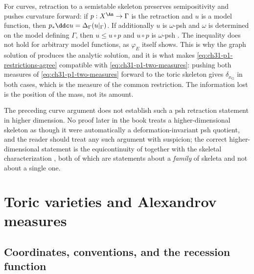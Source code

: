 \begin{remark}
\label{rem:ch31-retraction}
For curves, retraction to a semistable skeleton preserves semipositivity and
pushes curvature forward: if $p:X^{\An}\to\Gamma$ is the retraction and
$u$ is a model function, then $p_*\ddc u=\Delta_\Gamma(u|_\Gamma)$.
If additionally $u$ is $\omega$-psh and $\omega$ is determined on the
model defining $\Gamma$, then $u\leq u\circ p$ and $u\circ p$ is
$\omega$-psh \cite[Proposition~3.8]{GJKM19}.  The inequality does not
hold for arbitrary model functions, as $\varphi_E$ itself shows.  This is why the graph solution of
 produces the analytic solution, and it is what
makes \eqref{eq:ch31-p1-restrictions-agree} compatible with
\eqref{eq:ch31-p1-two-measures}: pushing both measures of
\eqref{eq:ch31-p1-two-measures} forward to the toric skeleton gives
$\delta_{x_{\mathrm G}}$ in both cases, which is the measure of the common
restriction.  The information lost is the position of the mass, not its
amount.

The preceding curve argument does not establish such a psh retraction
statement in higher dimension.  No
proof later in the book treats a higher-dimensional skeleton as though it
were automatically a deformation-invariant psh quotient, and the reader
should treat any such argument with suspicion; the correct higher-dimensional
statement is the equicontinuity of 
together with the skeletal characterization
, both of which are statements about
a \emph{family} of skeleta and not about a single one.
\end{remark}

\section{Toric varieties and Alexandrov measures}
\label{sec:ch31-toric}

\subsection{Coordinates, conventions, and the recession function}
\label{sec:ch31-toric-setup}

